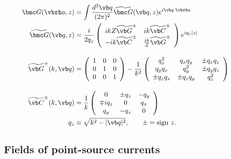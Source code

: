 \documentclass[letterpaper]{article}
\renewcommand{\wt}{\widetilde}
\begin{document}
\begin{subequations}
\begin{align}
  \bmc G(\vbrho, z)
 &=
  \int \frac{d^2 \vb q}{(2\pi)^2}
  \wt{\bmc G}(\vb q, z) e^{i\vb q \cdot \vbrho}
\\
   \wt{\bmc G}(\vb q, z)
&= \frac{i}{2q_z}
   \left(\begin{array}{cc}
   ikZ  \wt{\vb G}^\pm & ik\wt{\vb C}^\pm \\
  -ik\wt{ \vb C}^\pm & \frac{ik}{Z}\wt{\vb G}^\pm
   \end{array}\right)e^{iq_z |z|}
\\[10pt]
   \wt{\vb G}^\pm(k, \vb q) 
&= \left(\begin{array}{ccc}
   1 & 0 & 0 \\ 0 & 1 & 0 \\ 0 & 0 & 1
   \end{array}\right)
   -
   \frac{1}{k^2}
   \left(\begin{array}{ccc}
    q_x^2    & q_xq_y       & \pm q_x q_z \\
    q_y q_x  & q_y^2        & \pm q_y q_z \\
 \pm q_z q_x  & \pm q_z q_y  & q_z^2 
   \end{array}\right)
\\[10pt]
   \wt{\vb C}^\pm(k, \vb q) 
&=
   \frac{1}{k} 
   \left(\begin{array}{ccc}
   0           & \pm q_z &    -q_y \\
   \mp iq_z    & 0       &     q_x \\
        q_y    & -q_x    &      0
  \end{array}\right)
\\
  q_z &\equiv \sqrt{k^2 - |\vb q|^2},
 \qquad \pm = \text{sign } z.
\end{align}
\label{GFourier}
\end{subequations}

\subsection*{Fields of point-source currents}
\end{document}
